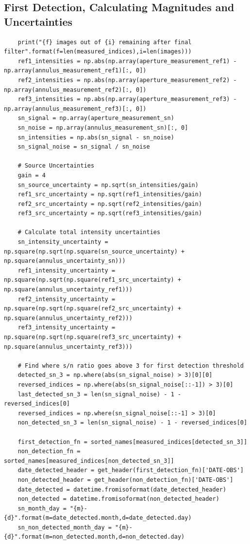 \documentclass{article}
\begin{document}
\begin{appendices}
\subsection{First Detection, Calculating Magnitudes and Uncertainties}
\begin{verbatim}
    print("{f} images out of {i} remaining after final filter".format(f=len(measured_indices),i=len(images)))
    ref1_intensities = np.abs(np.array(aperture_measurement_ref1) - np.array(annulus_measurement_ref1)[:, 0])
    ref2_intensities = np.abs(np.array(aperture_measurement_ref2) - np.array(annulus_measurement_ref2)[:, 0])
    ref3_intensities = np.abs(np.array(aperture_measurement_ref3) - np.array(annulus_measurement_ref3)[:, 0])
    sn_signal = np.array(aperture_measurement_sn)
    sn_noise = np.array(annulus_measurement_sn)[:, 0]
    sn_intensities = np.abs(sn_signal - sn_noise)
    sn_signal_noise = sn_signal / sn_noise
    
    # Source Uncertainties
    gain = 4
    sn_source_uncertainty = np.sqrt(sn_intensities/gain)
    ref1_src_uncertainty = np.sqrt(ref1_intensities/gain)
    ref2_src_uncertainty = np.sqrt(ref2_intensities/gain)
    ref3_src_uncertainty = np.sqrt(ref3_intensities/gain)
    
    # Calculate total intensity uncertainties
    sn_intensity_uncertainty = np.square(np.sqrt(np.square(sn_source_uncertainty) + np.square(annulus_uncertainty_sn)))
    ref1_intensity_uncertainty = np.square(np.sqrt(np.square(ref1_src_uncertainty) + np.square(annulus_uncertainty_ref1)))
    ref2_intensity_uncertainty = np.square(np.sqrt(np.square(ref2_src_uncertainty) + np.square(annulus_uncertainty_ref2)))
    ref3_intensity_uncertainty = np.square(np.sqrt(np.square(ref3_src_uncertainty) + np.square(annulus_uncertainty_ref3)))
    
    # Find where s/n ratio goes above 3 for first detection threshold
    detected_sn_3 = np.where(abs(sn_signal_noise) > 3)[0][0]
    reversed_indices = np.where(abs(sn_signal_noise[::-1]) > 3)[0]
    last_detected_sn_3 = len(sn_signal_noise) - 1 - reversed_indices[0]
    reversed_indices = np.where(sn_signal_noise[::-1] > 3)[0]
    non_detected_sn_3 = len(sn_signal_noise) - 1 - reversed_indices[0]
    
    first_detection_fn = sorted_names[measured_indices[detected_sn_3]]
    non_detection_fn = sorted_names[measured_indices[non_detected_sn_3]]
    date_detected_header = get_header(first_detection_fn)['DATE-OBS']
    non_detected_header = get_header(non_detection_fn)['DATE-OBS']
    date_detected = datetime.fromisoformat(date_detected_header)
    non_detected = datetime.fromisoformat(non_detected_header)
    sn_month_day = "{m}-{d}".format(m=date_detected.month,d=date_detected.day)
    sn_non_detected_month_day = "{m}-{d}".format(m=non_detected.month,d=non_detected.day)
    

\end{verbatim}
\end{appendices}
\end{document}
